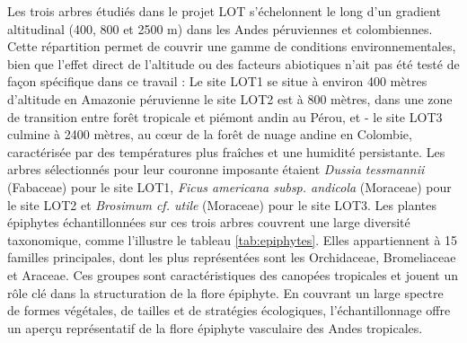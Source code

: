\documentclass[a4paper,12pt]{article}
\begin{document}
Les trois arbres étudiés dans le projet LOT s’échelonnent le long d’un gradient altitudinal (400, 800 et  2500 m) dans les Andes péruviennes et colombiennes. Cette répartition permet de couvrir une gamme de conditions environnementales, bien que l’effet direct de l’altitude ou des facteurs abiotiques n’ait pas été testé de façon spécifique dans ce travail : Le site LOT1 se situe à environ 400 mètres d’altitude  en Amazonie péruvienne le site LOT2 est à 800 mètres, dans une zone de transition entre forêt tropicale et piémont andin au Pérou, et - le site LOT3 culmine à 2400 mètres, au cœur de la forêt de nuage andine en Colombie, caractérisée par des températures plus fraîches et une humidité persistante. Les arbres sélectionnés pour leur couronne imposante étaient  \textit{Dussia tessmannii} (Fabaceae) pour le site LOT1, \textit{Ficus americana subsp. andicola} (Moraceae) pour le site LOT2 et \textit{Brosimum cf. utile} (Moraceae) pour le site LOT3. 
Les plantes épiphytes échantillonnées sur ces trois arbres couvrent une large diversité taxonomique, comme l’illustre le tableau \ref{tab:epiphytes}. Elles appartiennent à 15 familles principales, dont les plus représentées sont les Orchidaceae, Bromeliaceae et Araceae. Ces groupes sont caractéristiques des canopées tropicales et jouent un rôle clé dans la structuration de la flore épiphyte. En couvrant un large spectre de formes végétales, de tailles et de stratégies écologiques, l’échantillonnage offre un aperçu représentatif de la flore épiphyte vasculaire des Andes tropicales.
\end{document}
